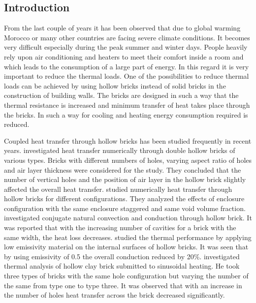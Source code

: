 \documentclass{article}
\begin{document}
\begin{multicols}{2}
\section{Introduction}
From the last couple of years it has been observed that due to global warming Morocco or many other countries are facing severe climate conditions. It becomes very difficult especially during the peak summer and winter days. People heavily rely upon air conditioning and heaters to meet their comfort inside a room and which leads to the consumption of a large part of energy. In this regard it is very important to reduce the thermal loads. One of the possibilities to reduce thermal loads can be achieved by using hollow bricks instead of solid bricks in the construction of building walls. The bricks are designed in such a way that the thermal resistance is increased and minimum transfer of heat takes place through the bricks. In such a way for cooling and heating energy consumption required is reduced.

             Coupled heat transfer through hollow bricks has been studied frequently in recent years. \textcite{boukendil2009numerical} investigated heat transfer numerically through double hollow bricks of various types. Bricks with different numbers of holes, varying aspect ratio of holes and air layer thickness were considered for the study. They concluded that the number of vertical holes and the position of air layer in the hollow brick slightly affected the overall heat transfer. \textcite{sun2009numerical} studied numerically heat transfer through hollow bricks for different configurations. They analyzed the effects of enclosure configuration with the same enclosure staggered and same void volume fraction. \textcite{antar2009conjugate} investigated conjugate natural convection and conduction through hollow brick. It was reported that with the increasing number of cavities for a brick with the same width, the heat loss decreases. \textcite{principi2012thermal} studied the thermal performance by applying low emissivity material on the internal surfaces of hollow bricks. It was seen that by using emissivity of 0.5 the overall conduction reduced by 20\%. \textcite{jamal2021thermal} investigated thermal analysis of hollow clay brick submitted to sinusoidal heating. He took three types of bricks with the same hole configuration but varying the number of the same from type one to type three. It was observed that with an increase in the number of holes heat transfer across the brick decreased significantly.
             

\end{multicols}
\end{document}
